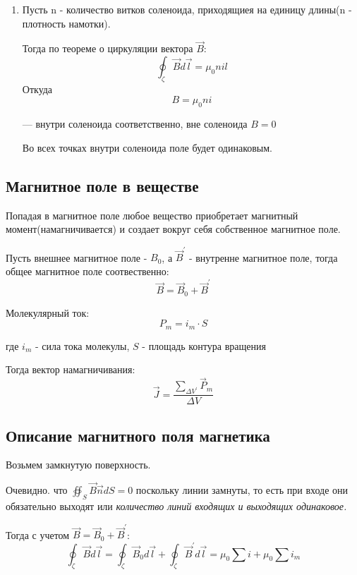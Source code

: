 \documentclass[../main.tex]{subfiles}
\begin{document}
\begin{enumerate}
    \item Пусть n - количество витков соленоида, приходящиея на единицу длины(n - плотность намотки).

          Тогда по теореме о циркуляции вектора $\vec B$:
          \[\oint_{\zeta} \vec B d \vec l = \mu_0 n i l\]
          Откуда
          \[B = \mu_0 n i\]
          \begin{center}
              --- внутри соленоида соответственно, вне соленоида $B = 0$
          \end{center}
          Во всех точках внутри соленоида поле будет одинаковым.
\end{enumerate}

\subsection{Магнитное поле в веществе}
Попадая в магнитное поле любое вещество приобретает магнитный момент(намагничивается) и создает вокруг себя собственное магнитное поле.

Пусть внешнее магнитное поле - $B_0$, а $\vec B^{\prime}$ - внутренне магнитное поле, тогда общее магнитное поле соотвественно:
\[\vec B = \vec B_0 + \vec B^{\prime}\]

Молекулярный ток:
\[P_m = i_m \cdot S\]
\begin{center}
    где $i_m$ - сила тока молекулы, $S$ - площадь контура вращения
\end{center}
Тогда вектор намагничивания:
\[\vec J = \frac{\sum_{\Delta V^{\prime}} \vec P_m}{\Delta V}\]

\subsection{Описание магнитного поля магнетика}
Возьмем замкнутую поверхность.

Очевидно. что $\oiint_{S} \vec B \vec n dS = 0$ поскольку линии замнуты, то есть при входе они обязательно выходят или \textit{количество линий входящих и выходящих одинаковое.}

Тогда с учетом $\vec B = \vec B_0 + \vec B^{\prime}$:
\[\oint_{\zeta} \vec B d \vec l = \oint_{\zeta} \vec B_0 d \vec l  + \oint_{\zeta} \vec B^{\prime} d \vec l = \mu_0 \sum i + \mu_0 \sum i_m \]
\end{document}
